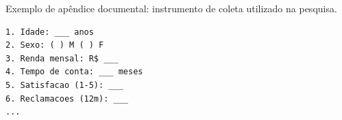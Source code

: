 \documentclass[
    12pt,
    oneside,
    a4paper,
    english,
    brazilian
    ]{abntex2}
\numberwithin{equation}{chapter}
\begin{document}
Exemplo de apêndice documental: instrumento de coleta utilizado na pesquisa.

\begin{lstlisting}[caption={Estrutura do questionario aplicado}]
1. Idade: ___ anos
2. Sexo: ( ) M ( ) F
3. Renda mensal: R$ ___
4. Tempo de conta: ___ meses
5. Satisfacao (1-5): ___
6. Reclamacoes (12m): ___
...
\end{lstlisting}

\newpage


\end{document}
